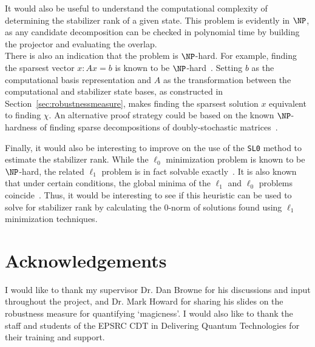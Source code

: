 \documentclass{standalone}
\begin{document}
\par
It would also be useful to understand the computational complexity of determining the stabilizer rank of a given state. This problem is evidently in $\NP$, as any candidate decomposition can be checked in polynomial time by building the projector and evaluating the overlap. \\
There is also an indication that the problem is $\NP$-hard. For example, finding the sparsest vector $x:Ax=b$ is known to be $\NP$-hard~\cite{ge2011note}. Setting $b$ as the computational basis representation and $A$ as the transformation between the computational and stabilizer state bases, as constructed in Section~\ref{sec:robustnessmeasure}, makes finding the sparsest solution $x$ equivalent to finding $\chi$. An alternative proof strategy could be based on the known $\NP$-hardness of finding sparse decompositions of doubly-stochastic matrices~\cite{Dufosse2016}.
\par
Finally, it would also be interesting to improve on the use of the \texttt{SL0} method to estimate the stabilizer rank. While the $\ell_{0}$ minimization problem is known to be $\NP$-hard, the related $\ell_{1}$ problem is in fact solvable exactly~\cite{Howard2016}. It is also known that under certain conditions, the global minima of the $\ell_{1}$ and $\ell_{0}$ problems coincide~\cite{Sawada2005}. Thus, it would be interesting to see if this heuristic can be used to solve for stabilizer rank by calculating the $0$-norm of solutions found using $\ell_{1}$ minimization techniques. 

\section*{Acknowledgements}
I would like to thank my supervisor Dr. Dan Browne for his discussions and input throughout the project, and Dr. Mark Howard for sharing his slides on the robustness measure for quantifying `magicness'. I would also like to thank the staff and students of the EPSRC CDT in Delivering Quantum Technologies for their training and support. 

\ifstandalone 

\fi
\end{document}
